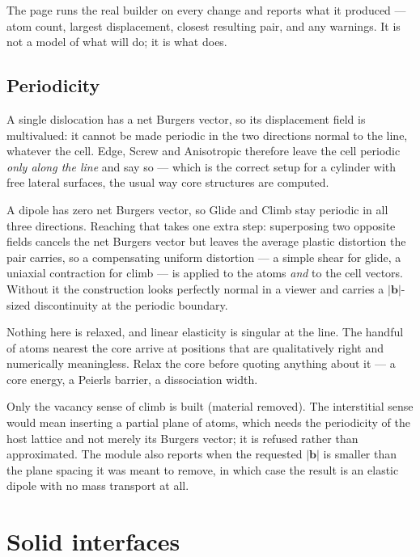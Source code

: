 The page runs the real builder on every change and reports what it
produced --- atom count, largest displacement, closest resulting pair, and
any warnings. It is not a model of what  will do; it is what
 does.

\subsection{Periodicity}

A single dislocation has a net Burgers vector, so its displacement field
is multivalued: it cannot be made periodic in the two directions normal
to the line, whatever the cell. Edge, Screw and Anisotropic therefore
leave the cell periodic \emph{only along the line} and say so --- which is
the correct setup for a cylinder with free lateral surfaces, the usual way
core structures are computed.

A dipole has zero net Burgers vector, so Glide and Climb stay periodic in
all three directions. Reaching that takes one extra step: superposing two
opposite fields cancels the net Burgers vector but leaves the average
plastic distortion the pair carries, so a compensating uniform distortion
--- a simple shear for glide, a uniaxial contraction for climb --- is
applied to the atoms \emph{and} to the cell vectors. Without it the
construction looks perfectly normal in a viewer and carries a
$|\mathbf{b}|$-sized discontinuity at the periodic boundary.

\begin{calwarn}
Nothing here is relaxed, and linear elasticity is singular at the line.
The handful of atoms nearest the core arrive at positions that are
qualitatively right and numerically meaningless. Relax the core before
quoting anything about it --- a core energy, a Peierls barrier, a
dissociation width.
\end{calwarn}

\begin{calnote}
Only the vacancy sense of climb is built (material removed). The
interstitial sense would mean inserting a partial plane of atoms, which
needs the periodicity of the host lattice and not merely its Burgers
vector; it is refused rather than approximated. The module also reports
when the requested $|\mathbf{b}|$ is smaller than the plane spacing it was
meant to remove, in which case the result is an elastic dipole with no
mass transport at all.
\end{calnote}

\section{Solid interfaces}
\label{sec:solid-interfaces}

